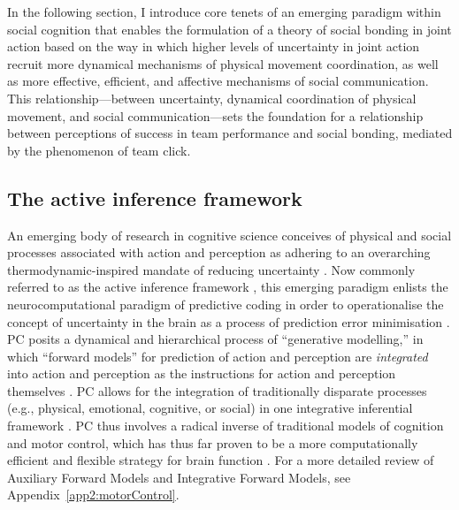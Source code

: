 \begin{CJK}{UTF8}{gbsn}
In the following section, I introduce core tenets of an emerging paradigm within social cognition that enables the formulation of a theory of social bonding in joint action based on the way in which higher levels of uncertainty in joint action recruit more dynamical mechanisms of physical movement coordination, as well as more effective, efficient, and affective mechanisms of social communication.   This relationship---between uncertainty, dynamical coordination of physical movement, and social communication---sets the foundation for a relationship between perceptions of success in team performance and social bonding, mediated by the phenomenon of team click.


\subsection{The active inference framework}
An emerging body of research in cognitive science conceives of physical and social processes associated with action and perception as adhering to an overarching thermodynamic-inspired mandate of reducing uncertainty \citep[referred to as variational or information-theoretic ``free energy''][]{Friston2015}.  Now commonly referred to as the active inference framework \citep[hereafter AIF][]{Friston2006,Friston2010,Clark2015,Linson2018}, this emerging paradigm enlists the neurocomputational paradigm of predictive coding \citep[hereafter PC; see][]{Rao1999} in order to operationalise the concept of uncertainty in the brain as a process of prediction error minimisation \citep{Clark2013}.  PC posits a dynamical and hierarchical process of ``generative modelling,'' in which ``forward models'' for prediction of action and perception are \textit{integrated} into action and perception as the instructions for action and perception themselves \citep[rather than being auxiliary to action and perception;]{Pickering2014}.  PC allows for the integration of traditionally disparate processes (e.g., physical, emotional, cognitive, or social) in one integrative inferential framework \citep{Clark2015}.  PC thus involves a radical inverse of traditional models of cognition and motor control, which has thus far proven to be a more computationally efficient and flexible strategy for brain function \citep{Pickering2014,Clark2015a}.  For a more detailed review of Auxiliary Forward Models and Integrative Forward Models, see Appendix~\ref{app2:motorControl}.


\end{CJK}

